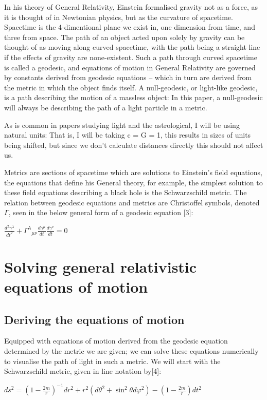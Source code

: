 \documentclass[oneside,openright,frontopenright]{dmathesis}
\begin{document}
	In his theory of General Relativity, Einstein formalised gravity not as a force, as it is thought of in Newtonian physics, but as the curvature of spacetime. Spacetime is the 4-dimentional plane we exist in, one dimension from time, and three from space. The path of an object acted upon solely by gravity can be thought of as moving along curved spacetime, with the path being a straight line if the effects of gravity are none-existent. Such a path through curved spacetime is called a geodesic, and equations of motion in General Relativity are governed by constants derived from geodesic equations – which in turn are derived from the metric in which the object finds itself. A null-geodesic, or light-like geodesic, is a path describing the motion of a massless object: In this paper, a null-geodesic will always be describing the path of a light particle in a metric.

	As is common in papers studying light and the astrological, I will be using natural units: That is, I will be taking c = G = 1, this results in sizes of units being shifted, but since we don't calculate distances directly this should not affect us.

	Metrics are sections of spacetime which are solutions to Einstein’s field equations, the equations that define his General theory, for example, the simplest solution to these field equations describing a black hole is the Schwarzschild metric. The relation between geodesic equations and metrics are Christoffel symbols, denoted $\Gamma$, seen in the below general form of a geodesic equation [3]:  


	${\frac{d^2 \gamma^\lambda}{dt^2} + {\Gamma^\lambda}_{\mu\nu} \frac{d\gamma^\mu}{dt} \frac{d\gamma^\nu}{dt} = 0}$

\chapter{Solving general relativistic equations of motion}
\section{Deriving the equations of motion}
	Equipped with equations of motion derived from the geodesic equation determined by the metric we are given; we can solve these equations numerically to visualise the path of light in such a metric. We will start with the Schwarzschild metric, given in line notation by[4]: 


	${ds^{2} = {(1-\frac {2m}{r})}^{-1}} {dr^2} + {r^2}({d\theta ^2} + {\sin ^2}{\theta}{d\varphi ^2}) -{(1-\frac {2m}{r})}{dt^2}$
\end{document}
